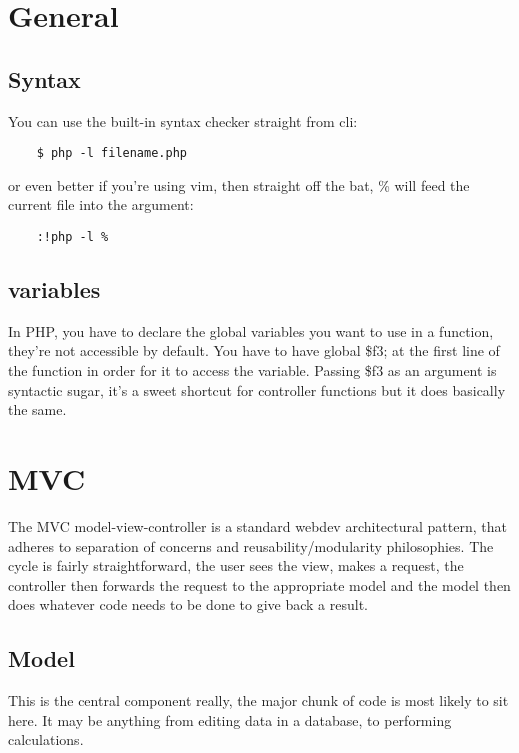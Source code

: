 \section{General}%
\label{sec:general}

\subsection{Syntax}%
\label{sub:syntax}

You can use the built-in syntax checker straight from cli:
\begin{verbatim}
	$ php -l filename.php
\end{verbatim}

or even better if you're using vim, then straight off the bat, \% will feed the current file into the argument:
\begin{verbatim}
	:!php -l %
\end{verbatim}

\subsection{variables}%
\label{sub:variables}

In PHP, you have to declare the global variables you want to use in a function, they're not accessible by default. You have to have global \$f3; at the first line of the function in order for it to access the variable.
Passing \$f3 as an argument is syntactic sugar, it's a sweet shortcut for controller functions but it does basically the same.

\section{MVC}%
\label{sec:mvc}

The MVC model-view-controller is a standard webdev architectural pattern, that adheres to separation of concerns and reusability/modularity philosophies. The cycle is fairly straightforward, the user sees the view, makes a request, the controller then forwards the request to the appropriate model and the model then does whatever code needs to be done to give back a result.

\subsection{Model}%
\label{sub:model}

This is the central component really, the major chunk of code is most likely to sit here. It may be anything from editing data in a database, to performing calculations.

